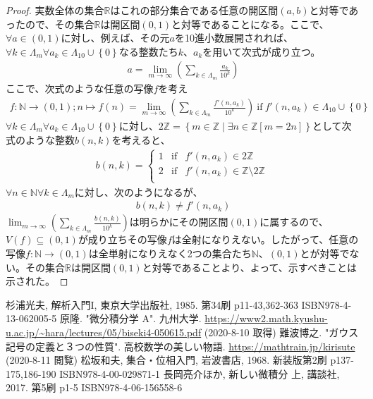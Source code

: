 \documentclass[dvipdfmx]{jsarticle}
\begin{document}
\begin{proof}
  実数全体の集合$\mathbb{R}$はこれの部分集合である任意の開区間$(a,b)$と対等であったので、その集合$\mathbb{R}$は開区間$(0,1)$と対等であることになる。ここで、$\forall a \in (0,1)$に対し、例えば、その元$a$を10進小数展開されれば、$\forall k \in \varLambda_{m}\forall a_{k} \in \varLambda_{10} \cup \left\{ 0 \right\}$なる整数たち$k$、$a_{k}$を用いて次式が成り立つ。
  \begin{align*}
  a = \lim_{m \rightarrow \infty}\left( \sum_{k \in \varLambda_{m}} \frac{a_{k}}{10^{k}} \right)
  \end{align*}
  ここで、次式のような任意の写像$f$を考え
  \begin{align*}
  f:\mathbb{N} \rightarrow (0,1);n \mapsto f(n) = \lim_{m \rightarrow \infty}\left( \sum_{k \in \varLambda_{m}} \frac{f'\left( n,a_{k} \right)}{10^{k}} \right)\ {\mathrm {if}}\ f'\left( n,a_{k} \right) \in \varLambda_{10} \cup \left\{ 0 \right\}
  \end{align*}
  $\forall k \in \varLambda_{m}\forall a_{k} \in \varLambda_{10} \cup \left\{ 0 \right\}$に対し、$2\mathbb{Z} = \left\{ m \in \mathbb{Z} \middle| \exists n \in \mathbb{Z}[ m = 2n] \right\}$として次式のような整数$b(n,k)$を考えると、
  \begin{align*}
  b(n,k) = \left\{ \begin{matrix}
  1 & {\mathrm {if}} & f'\left( n,a_{k} \right) \in 2\mathbb{Z} \\
  2 & {\mathrm {if}} & f'\left( n,a_{k} \right) \in \mathbb{Z} \setminus 2\mathbb{Z} \\
  \end{matrix} \right.\ 
  \end{align*}
  $\forall n \in \mathbb{N}\forall k \in \varLambda_{m}$に対し、次のようになるが、
  \begin{align*}
  b(n,k) \neq f'\left( n,a_{k} \right)
  \end{align*}
  $\lim_{m \rightarrow \infty}\left( \sum_{k \in \varLambda_{m}} \frac{b(n,k)}{10^{k}} \right)$は明らかにその開区間$(0,1)$に属するので、$V(f) \subseteq (0,1)$が成り立ちその写像$f$は全射になりえない。したがって、任意の写像$f:\mathbb{N} \rightarrow (0,1)$は全単射になりえなく2つの集合たち$\mathbb{N}$、$(0,1)$とが対等でない。その集合$\mathbb{R}$は開区間$(0,1)$と対等であることより、よって、示すべきことは示された。
\end{proof}
\begin{thebibliography}{50}
  杉浦光夫, 解析入門I, 東京大学出版社, 1985. 第34刷 p11-43,362-363 ISBN978-4-13-062005-5
  \bibitem{2}
  原隆. "微分積分学 A". 九州大学. \url{https://www2.math.kyushu-u.ac.jp/~hara/lectures/05/biseki4-050615.pdf} (2020-8-10 取得)
  \bibitem{3}
  難波博之. "ガウス記号の定義と３つの性質". 高校数学の美しい物語. \url{https://mathtrain.jp/kirisute} (2020-8-11 閲覧)
  \bibitem{4}
  松坂和夫, 集合・位相入門, 岩波書店, 1968. 新装版第2刷 p137-175,186-190 ISBN978-4-00-029871-1
  \bibitem{5}
  長岡亮介ほか, 新しい微積分 上, 講談社, 2017. 第5刷 p1-5 ISBN978-4-06-156558-6
\end{thebibliography}
\end{document}
